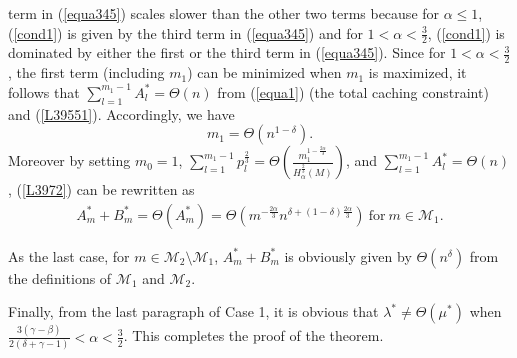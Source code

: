 \documentclass[10pt,journal,compsoc,onecolumn]{IEEEtran}
\begin{document}
term in (\ref{equa345}) scales slower than the other two terms
because for $\alpha\leq 1$, (\ref{cond1}) is given by the third
term in (\ref{equa345}) and for $1<\alpha<\frac{3}{2}$,
(\ref{cond1}) is dominated by either the first or the third term
in (\ref{equa345}). Since for $1<\alpha<\frac{3}{2}$, the first
term (including $m_1$) can be minimized when $m_1$ is maximized,
it follows that $\sum_{l=1}^{m_1-1}A_l^*=\Theta(n)$ from
(\ref{equa1}) (the total caching constraint) and (\ref{L39551}).
Accordingly, we have
\begin{equation}
\label{T3} m_1=\Theta(n^{1-\delta}). \nonumber
\end{equation}
Moreover by setting  $m_0=1$, $\sum_{l=1}^{m_1-1}
p^{\frac{2}{3}}_l=\Theta\left(\frac{m_1^{1-\frac{2\alpha}{3}}}{H^{\frac{2}{3}}_{\alpha}(M)}\right)$,
and $\sum_{l=1}^{m_1-1}A_l^*=\Theta(n)$, (\ref{L3972}) can be
rewritten as
\begin{align}
\label{T4} A_{m}^*+B_m^*=\Theta\left(
A_m^*\right)=\Theta\left(m^{-\frac{2\alpha}{3}}n^{\delta+(1-\delta)\frac{2\alpha}{3}}\right)~\text{for}~m
\in \mathcal{M}_1. \nonumber
\end{align}

As the last case, for $m\in\mathcal{M}_2\setminus \mathcal{M}_1$,
$A_m^*+B_m^*$ is obviously given by $\Theta(n^{\delta})$ from the
definitions of $\mathcal{M}_1$ and $\mathcal{M}_2$.

Finally, from the last paragraph of Case 1, it is obvious that
$\lambda^*\neq\Theta\left(\mu^*\right)$ when
$\frac{3(\gamma-\beta)}{2(\delta+\gamma-1)}<\alpha<\frac{3}{2}$.
This completes the proof of the theorem.



\end{document}

